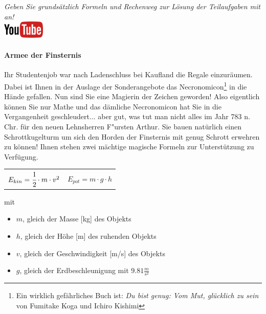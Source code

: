 \documentclass[a4paper, 10pt]{scrartcl}\usepackage[]{graphicx}\usepackage[]{xcolor}
\begin{document}
\textit{Geben Sie grunds{\"a}tzlich Formeln und Rechenweg zur L{\"o}sung der
  Teilaufgaben mit an!} \\[1Ex]

\hfill\href{https://youtu.be/Bbu6n8MXxQk}{\includegraphics[width =
  2cm]{img/youtube}} %
\hspace{2Ex}

\paragraph{Armee der Finsternis}



Ihr Studentenjob war nach Ladenschluss bei Kaufland die Regale
einzur{\"a}umen. Dabei ist Ihnen in der Auslage der Sonderangebote das
Necronomicon\footnote{Ein wirklich gef{\"a}hrliches Buch ist:
  \textit{Du bist genug: Vom Mut, gl{\"u}cklich zu sein} von Fumitake Koga und
  Ichiro Kishimi} in die H{\"a}nde gefallen. Nun sind Sie eine Magierin der
Zeichen geworden! Also eigentlich k{\"o}nnen Sie nur Mathe und das d{\"a}mliche
Necronomicon hat Sie in die Vergangenheit geschleudert... aber gut, was tut
man nicht alles im Jahr 783 n. Chr. f{\"u}r den neuen Lehnsherren
F{"u}rsten Arthur. Sie bauen nat{\"u}rlich einen Schrottkugelturm um sich den
Horden der Finsternis mit genug Schrott erwehren zu k{\"o}nnen! Ihnen stehen
zwei m{\"a}chtige magische Formeln zur Unterst{\"u}tzung zu Verf{\"u}gung.

\begin{center}
  \begin{tabular}{cc}
    $E_{kin} = \cfrac{1}{2}\cdot m \cdot v^2$ & $E_{pot} = m \cdot g \cdot h$\\
  \end{tabular}
\end{center}

mit

\begin{itemize}
\item $m$, gleich der Masse [kg] des Objekts
\item $h$, gleich der H{\"o}he [m] des ruhenden Objekts
\item $v$, gleich der Geschwindigkeit [m/s] des Objekts
\item $g$, gleich der Erdbeschleunigung mit $9.81 \tfrac{m}{s^2}$ 
\end{itemize}
\end{document}
